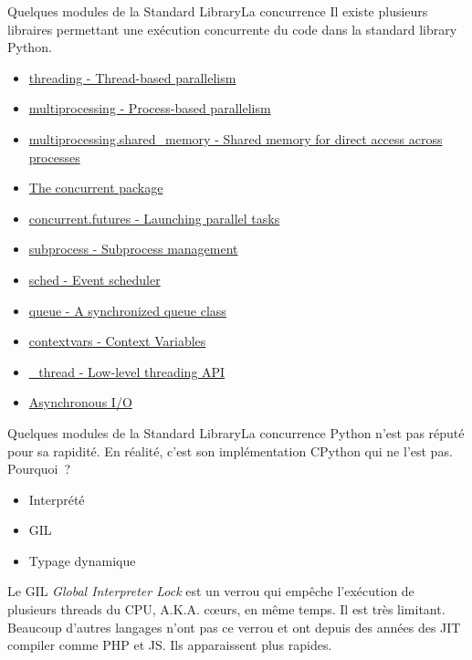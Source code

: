 \documentclass{beamer}
\begin{document}
    \begin{frame}{Quelques modules de la Standard Library}{La concurrence}
        Il existe plusieurs libraires permettant une exécution concurrente du code dans la standard library Python.
        \begin{itemize}
            \item \href{https://docs.python.org/3/library/threading.html}{threading - Thread-based parallelism}
            \item \href{https://docs.python.org/3/library/multiprocessing.html}{multiprocessing - Process-based parallelism}
            \item \href{https://docs.python.org/3/library/multiprocessing.shared_memory.html}{multiprocessing.shared\_memory - Shared memory for direct access across processes}
            \item \href{https://docs.python.org/3/library/concurrent.html}{The concurrent package}
            \item \href{https://docs.python.org/3/library/concurrent.futures.html}{concurrent.futures - Launching parallel tasks}
            \item \href{https://docs.python.org/3/library/subprocess.html}{subprocess - Subprocess management}
            \item \href{https://docs.python.org/3/library/sched.html}{sched - Event scheduler}
            \item \href{https://docs.python.org/3/library/queue.html}{queue - A synchronized queue class}
            \item \href{https://docs.python.org/3/library/contextvars.html}{contextvars - Context Variables}
            \item \href{https://docs.python.org/3/library/\_thread.html}{\_thread - Low-level threading API}
            \item \href{https://docs.python.org/3/library/asyncio.html}{Asynchronous I/O}
        \end{itemize}
    \end{frame}

    \begin{frame}{Quelques modules de la Standard Library}{La concurrence}
        Python n'est pas réputé pour sa rapidité.
        En réalité, c'est son implémentation CPython qui ne l'est pas.
        \bigbreak
        Pourquoi~?
        \pause
        \begin{itemize}
            \item Interprété
            \item GIL
            \item Typage dynamique
        \end{itemize}
        Le GIL \textit{Global Interpreter Lock} est un verrou qui empêche l'exécution de plusieurs threads du CPU, A.K.A. cœurs, en même temps.
        Il est très limitant.
        Beaucoup d'autres langages n'ont pas ce verrou et ont depuis des années des JIT compiler comme PHP et JS.
        Ils apparaissent plus rapides.
    \end{frame}
\end{document}

